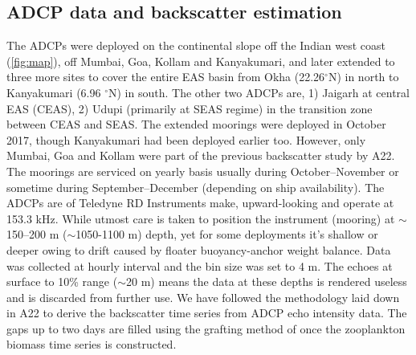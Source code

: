 \documentclass{article}
\begin{document}
	
	\subsection{ADCP data and backscatter estimation}
    The ADCPs were deployed on the continental slope off the Indian west coast (\cref{fig:map}), off Mumbai, Goa, Kollam and Kanyakumari, and later extended to three more sites to cover the entire EAS basin from Okha (22.26$^{\circ}$N) in north to Kanyakumari (6.96 $^{\circ}$N) in south. The other two ADCPs are, 1) Jaigarh at central EAS (CEAS), 2) Udupi (primarily at SEAS regime) in the transition zone between CEAS and SEAS. The extended moorings were deployed in October 2017, though Kanyakumari had been deployed earlier too. However, only Mumbai, Goa and Kollam were part of the previous backscatter study by A22. The moorings are serviced on yearly basis usually during October--November or sometime during September--December (depending on ship availability). The ADCPs are of Teledyne RD Instruments  make, upward-looking and operate at 153.3 kHz. While utmost care is taken to position the instrument (mooring) at  $\sim$150--200 m ($\sim$1050-1100 m) depth, yet for some deployments it's shallow or deeper owing to drift caused by floater buoyancy-anchor weight balance. Data was collected at hourly interval and the bin size was set to 4 m. The echoes at surface to 10\% range ($\sim$20 m) means the data at these depths is rendered useless and is discarded from further use.  We have followed the methodology laid down in A22 to derive the backscatter time series from ADCP echo intensity data. The gaps up to two days are filled using the grafting method of \citet{mukhopadhyay2017st} once the zooplankton biomass time series is constructed.
   
\end{document}
